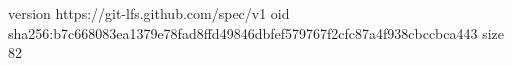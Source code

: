 version https://git-lfs.github.com/spec/v1
oid sha256:b7c668083ea1379e78fad8ffd49846dbfef579767f2cfc87a4f938cbccbca443
size 82
